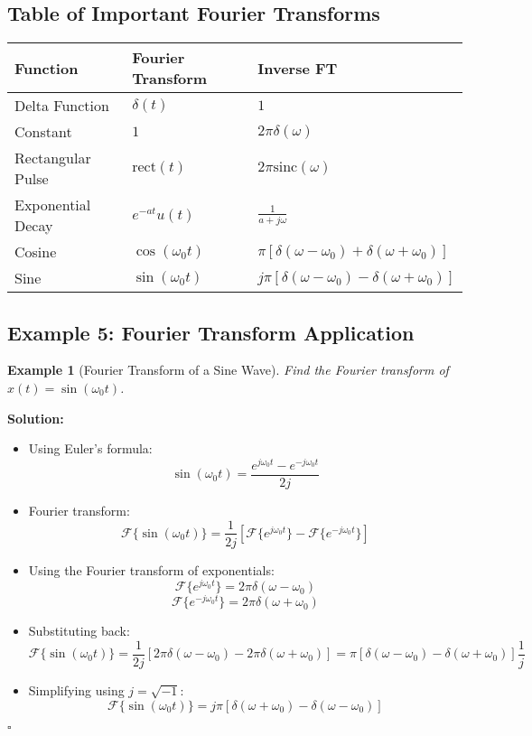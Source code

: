 \documentclass[12pt]{article}
\newtheorem{example}{Example}
\newenvironment{solution}{\noindent\textbf{Solution:}}{\hfill$\square$}
\begin{document}
\subsection{Table of Important Fourier Transforms}
\begin{center}
\begin{tabular}{@{}lll@{}}
\toprule
\textbf{Function} & \textbf{Fourier Transform} & \textbf{Inverse FT} \\ \midrule
Delta Function & \( \delta(t) \) & \( 1 \) \\
Constant & \( 1 \) & \( 2\pi \delta(\omega) \) \\
Rectangular Pulse & \( \text{rect}(t) \) & \( 2\pi \text{sinc}(\omega) \) \\
Exponential Decay & \( e^{-at} u(t) \) & \( \frac{1}{a + j\omega} \) \\
Cosine & \( \cos(\omega_0 t) \) & \( \pi [\delta(\omega - \omega_0) + \delta(\omega + \omega_0)] \) \\
Sine & \( \sin(\omega_0 t) \) & \( j\pi [\delta(\omega - \omega_0) - \delta(\omega + \omega_0)] \) \\
\bottomrule
\end{tabular}
\end{center}

\subsection{Example 5: Fourier Transform Application}
\begin{example}[Fourier Transform of a Sine Wave]
Find the Fourier transform of \( x(t) = \sin(\omega_0 t) \).
\end{example}
\begin{solution}
\begin{itemize}
    \item Using Euler's formula:
    \[
    \sin(\omega_0 t) = \frac{e^{j\omega_0 t} - e^{-j\omega_0 t}}{2j}
    \]
    \item Fourier transform:
    \[
    \mathcal{F}\{\sin(\omega_0 t)\} = \frac{1}{2j} \left[ \mathcal{F}\{e^{j\omega_0 t}\} - \mathcal{F}\{e^{-j\omega_0 t}\} \right]
    \]
    \item Using the Fourier transform of exponentials:
    \[
    \mathcal{F}\{e^{j\omega_0 t}\} = 2\pi \delta(\omega - \omega_0)
    \]
    \[
    \mathcal{F}\{e^{-j\omega_0 t}\} = 2\pi \delta(\omega + \omega_0)
    \]
    \item Substituting back:
    \[
    \mathcal{F}\{\sin(\omega_0 t)\} = \frac{1}{2j} \left[ 2\pi \delta(\omega - \omega_0) - 2\pi \delta(\omega + \omega_0) \right] = \pi \left[ \delta(\omega - \omega_0) - \delta(\omega + \omega_0) \right] \frac{1}{j}
    \]
    \item Simplifying using \( j = \sqrt{-1} \):
    \[
    \mathcal{F}\{\sin(\omega_0 t)\} = j\pi \left[ \delta(\omega + \omega_0) - \delta(\omega - \omega_0) \right]
    \]
\end{itemize}
\end{solution}
\end{document}
